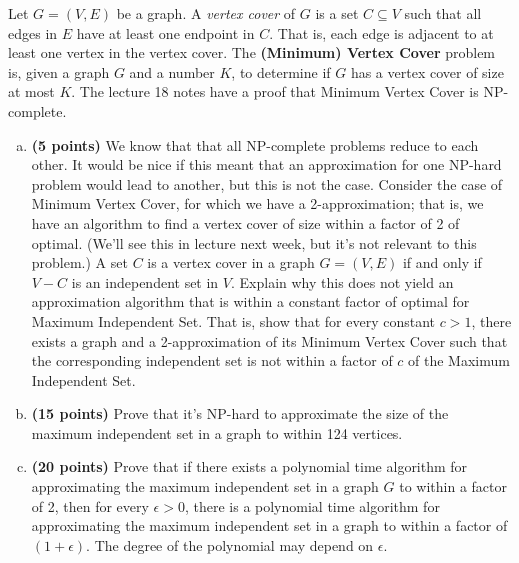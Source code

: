 \documentclass[11pt,letterpaper]{article}
\begin{document}
\pagebreak
\begin{problem}
    Let $G=(V,E)$ be a graph. A {\em vertex cover} of $G$ is a set $C \subseteq V$ such that all edges in $E$ have at least one endpoint in $C$.  That is, each edge is adjacent to at least one vertex in the vertex cover. The {\bf (Minimum) Vertex Cover} problem is, given a graph $G$ and a number $K$, to determine if $G$ has a vertex cover of size at most $K$. The lecture 18 notes have a proof that Minimum Vertex Cover is NP-complete.
    \begin{enumerate}[(a)]
         \item {\bf (5 points)} We know that that all NP-complete problems reduce to each other.  It would be nice if this meant that an approximation for one NP-hard problem would lead to another, but this is not the case. Consider the case of Minimum Vertex Cover, for which we have a 2-approximation; that is, we have an algorithm to find a vertex cover of size within a factor of 2 of optimal. (We'll see this in lecture next week, but it's not relevant to this problem.) A set $C$ is a vertex cover in a graph $G=(V,E)$ if and only if $V-C$ is an independent set in $V$.  Explain why this does not yield an approximation algorithm that is within a constant factor of optimal for Maximum Independent Set.  That is, show that for every constant $c > 1$, there exists a graph and a 2-approximation of its Minimum Vertex Cover such that the corresponding independent set is not within a factor of $c$ of the Maximum Independent Set.

        \item {\bf (15 points)} Prove that it's NP-hard to approximate the size of the maximum independent set in a graph to within 124 vertices.

        \item {\bf (20 points)} Prove that if there exists a polynomial time algorithm for approximating the maximum independent set in a graph $G$ to within a factor of 2, then for every $\epsilon > 0$, there is a polynomial time algorithm for approximating the maximum independent set in a graph to within a factor of $(1+\epsilon)$. The degree of the polynomial may depend on $\epsilon$.  
    \end{enumerate}
\end{problem}
\end{document}
